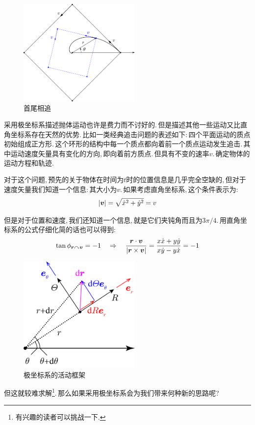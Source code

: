 \begin{figure}\label{6-1-5}
\vspace{-0.4cm}
\centering
\includegraphics[width=6cm]{image/6-1-5.png}
\caption{首尾相追}
\end{figure}
采用极坐标系描述抛体运动也许是费力而不讨好的.\,但是描述其他一些运动又比直角坐标系存在天然的优势.\,比如一类经典追击问题的表述如下:\,四个平面运动的质点初始组成正方形.\,这个环形的结构中每一个质点都向着前一个质点运动发生追击.\,其中运动速度矢量具有变化的方向,\,即向着前方质点.\,但具有不变的速率$v$.\,确定物体的运动方程和轨迹.

对于这个问题,\,预先的关于物体在时间为$t$时的位置信息是几乎完全空缺的,\,但对于速度矢量我们知道一个信息:\,其大小为$v$.\,如果考虑直角坐标系,\,这个条件表示为:
\[|\boldsymbol{v}|=\sqrt{\dot{x}^2+\dot{y}^2}=v\]

但是对于位置和速度,\,我们还知道一个信息,\,就是它们夹钝角而且为$3\pi/4$.\,用直角坐标系的公式仔细化简的话也可以得到:
\[\tan \phi_{\boldsymbol{r}\curvearrowright \boldsymbol{v}}=-1\quad \Rightarrow \quad \frac{\boldsymbol{r}\cdot\boldsymbol{v}}{|\boldsymbol{r}\times \boldsymbol{v}|}=\frac{x\dot{x}+y\dot{y}}{x\dot{y}-y\dot{x}}=-1\]

\begin{figure}\label{6-1-6}
\vspace{-0.4cm}
\centering
\includegraphics[width=6cm]{image/6-1-6.png}
\caption{极坐标系的活动框架}
\end{figure}
但这就较难求解\footnote{有兴趣的读者可以挑战一下.}.\,那么如果采用极坐标系会为我们带来何种新的思路呢?

